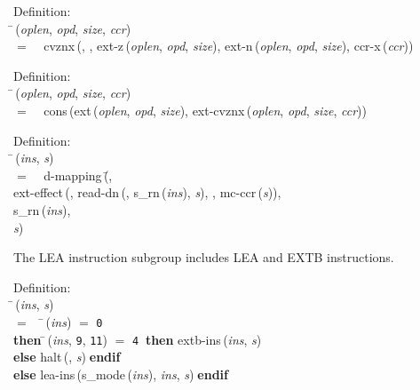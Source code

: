 \begin{tabbing}{\sc Definition}: \\  
\=\,({\it{oplen\/}}, {\it{opd\/}}, {\it{size\/}}, {\it{ccr\/}}) \\ 
$=$$\;\;\;\;${\rm{cvznx}}\,({}, {}, {\rm{ext-z}}\,({\it{oplen\/}}, {\it{opd\/}}, {\it{size\/}}), {\rm{ext-n}}\,({\it{oplen\/}}, {\it{opd\/}}, {\it{size\/}}), {\rm{ccr-x}}\,({\it{ccr\/}}))\-
\end{tabbing}

\begin{tabbing}{\sc Definition}: \\  
\=\,({\it{oplen\/}}, {\it{opd\/}}, {\it{size\/}}, {\it{ccr\/}}) \\ 
$=$$\;\;\;\;${\rm{cons}}\,({\rm{ext}}\,({\it{oplen\/}}, {\it{opd\/}}, {\it{size\/}}), {\rm{ext-cvznx}}\,({\it{oplen\/}}, {\it{opd\/}}, {\it{size\/}}, {\it{ccr\/}}))\-
\end{tabbing}

\begin{tabbing}{\sc Definition}: \\  
\=\,({\it{ins\/}}, {\it{s\/}}) \\ 
$=$$\;\;\;\;${\rm{d-mapping}}\,(\=, \\ 
{\rm{ext-effect}}\,({}, {\rm{read-dn}}\,({}, {\rm{s\_rn}}\,({\it{ins\/}}), {\it{s\/}}), {}, {\rm{mc-ccr}}\,({\it{s\/}})), \\ 
{\rm{s\_rn}}\,({\it{ins\/}}), \\ 
{\it{s\/}})\-\-
\end{tabbing}

 The LEA instruction subgroup includes LEA and EXTB instructions.
\begin{tabbing}{\sc Definition}: \\  
\=\,({\it{ins\/}}, {\it{s\/}}) \\ 
$=$$\;\;\;\;$\=\,({\it{ins\/}}) $=$ {\tt{0}} \\ 
{\bf then }\=\,({\it{ins\/}}, {\tt{9}}, {\tt{11}}) $=$ {\tt{4}}$\;\;${\bf then }{\rm{extb-ins}}\,({\it{ins\/}}, {\it{s\/}}) \\ 
{\bf else }{\rm{halt}}\,({}, {\it{s\/}})$\;${\bf  endif}\- \\ 
{\bf else }{\rm{lea-ins}}\,({\rm{s\_mode}}\,({\it{ins\/}}), {\it{ins\/}}, {\it{s\/}})$\;${\bf  endif}\-\-
\end{tabbing}

